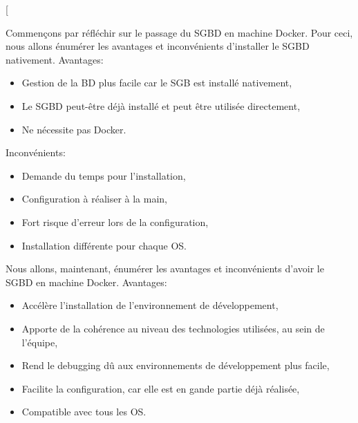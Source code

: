 \documentclass[
    iai, %
    il, %
]{heig-tb}
\begin{document}
\begin{multicols}{2}
    [

        Commençons par réfléchir sur le passage du SGBD en machine Docker.
        Pour ceci, nous allons énumérer les avantages et inconvénients d'installer le SGBD nativement.
        Avantages:
        \begin{itemize}
            \item Gestion de la BD plus facile car le SGB est installé nativement,
            \item Le SGBD peut-être déjà installé et peut être utilisée directement,
            \item Ne nécessite pas Docker.
        \end{itemize}

        Inconvénients:
        \begin{itemize}
            \item Demande du temps pour l'installation,
            \item Configuration à réaliser à la main,
            \item Fort risque d'erreur lors de la configuration,
            \item Installation différente pour chaque OS.
        \end{itemize}

        Nous allons, maintenant, énumérer les avantages et inconvénients d'avoir le SGBD en machine Docker.
        Avantages:
        \begin{itemize}
            \item Accélère l'installation de l'environnement de développement, \cite{labrecque,data-flair-pros-cons}
            \item Apporte de la cohérence au niveau des technologies utilisées, au sein de l'équipe, \cite{labrecque, data-flair-use-cases}
            \item Rend le debugging dû aux environnements de développement plus facile, \cite{labrecque,koukia}
            \item Facilite la configuration, car elle est en gande partie déjà réalisée, \cite{data-flair-pros-cons}
            \item Compatible avec tous les OS.
        \end{itemize}


\end{multicols}
\end{document}
